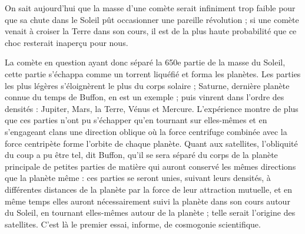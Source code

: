 \documentclass[a4paper, 11pt, oneside, landscape]{article}
\begin{document}
On sait aujourd'hui que la masse d'une comète serait infiniment trop faible pour que sa chute dans le Soleil pût occasionner une pareille révolution ; si une comète venait à croiser la Terre dans son cours, il est de la plus haute probabilité que ce choc resterait inaperçu pour nous.

La comète en question ayant donc séparé la 650e partie de la masse du Soleil, cette partie s'échappa comme un torrent liquéfié et forma les planètes. Les parties les plus légères s'éloignèrent le plus du corps solaire ; Saturne, dernière planète connue du temps de Buffon, en est un exemple ; puis vinrent dans l'ordre des densités : Jupiter, Mars, la Terre, Vénus et Mercure. L'expérience montre de plus que ces parties n'ont pu s'échapper qu'en tournant sur elles-mêmes et en s'engageant clans une direction oblique où la force centrifuge combinée avec la force centripète forme l'orbite de chaque planète. Quant aux satellites, l'obliquité du coup a pu être tel, dit Buffon, qu'il se sera séparé du corps de la planète principale de petites parties de matière qui auront conservé les mêmes directions que la planète même : ces parties se seront unies, suivant leurs densités, à différentes distances de la planète par la force de leur attraction mutuelle, et en même temps elles auront nécessairement suivi la planète dans son cours autour du Soleil, en tournant elles-mêmes autour de la planète ; telle serait l'origine des satellites. C'est là le premier essai, informe, de cosmogonie scientifique.
\end{document}
